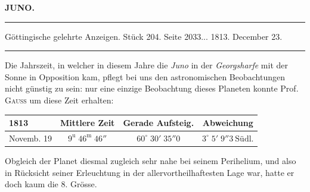 \clearpage{}\hypertarget{native-377-lower}{}\label{native-377-lower}
\begin{center}\textbf{JUNO.}\par\vspace{4pt}\hrule\vspace{4pt}\fontsize{10}{12}\selectfont Göttingische gelehrte Anzeigen. Stück 204. Seite 2033\;... 1813. December 23.\par\vspace{4pt}\hrule\vspace{4pt}\end{center}


\par\indent Die Jahrszeit, in welcher in diesem Jahre die \emph{Juno} in der \emph{Georgsharfe} mit der Sonne in Opposition kam, pflegt bei uns den astronomischen Beobachtungen nicht günstig zu sein: nur eine einzige Beobachtung dieses Planeten konnte Prof. \textsc{Gauss} um diese Zeit erhalten:
\begin{center}\fontsize{10}{12}\selectfont\setlength{\tabcolsep}{4pt}\renewcommand{\arraystretch}{1.15}\begin{tabular}{l|c|c|c}
1813 & Mittlere Zeit & Gerade Aufsteig. & Abweichung\\\hline
Novemb. 19 & $9^{\mathrm u}\;46^{\mathrm m}\;46''$ & $60^\circ\;30'\;35''0$ & $3^\circ\;5'\;9''3\ \text{Südl.}$\\
\end{tabular}\end{center}
\par\indent Obgleich der Planet diesmal zugleich sehr nahe bei seinem Perihelium, und also in Rücksicht seiner Erleuchtung in der allervortheilhaftesten Lage war, hatte er doch kaum die 8. Grösse.

